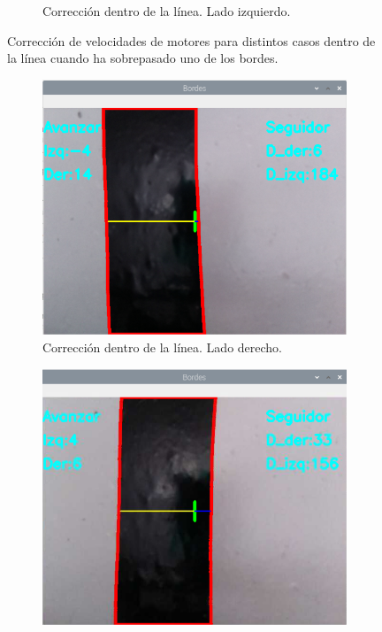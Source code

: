 \documentclass[11pt,a4paper]{article}
\begin{document}
\begin{itemize}
\begin{figure}[h!]
\begin{subfigure}{0.45\textwidth}
				\caption{Corrección dentro de la línea. Lado izquierdo.}
				\label{subfig:seguidor_brusco_izq2}
			\end{subfigure}
			\caption{Corrección de velocidades de motores para distintos casos dentro de la línea cuando ha sobrepasado uno de los bordes.}
			\label{fig:seguidor_brusco}
		\end{figure}
			
		\begin{figure}[h!]
		\ContinuedFloat
			\begin{subfigure}{0.45\textwidth}
				\includegraphics[width=\textwidth]{imagenes/seguidor_brusco_der1.png}
				\caption{Corrección dentro de la línea. Lado derecho.}
				\label{subfig:seguidor_brusco_der1}
			\end{subfigure}
			\hfill
			\begin{subfigure}{0.45\textwidth}
				\includegraphics[width=\textwidth]{imagenes/seguidor_brusco_der2.png}

\end{subfigure}
\end{figure}
\end{itemize}
\end{document}
